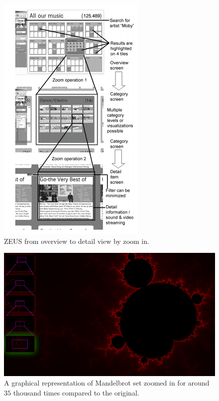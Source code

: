 \begin{figure}[H]
\centering
\includegraphics{Figures/Chapter1/zeus.png}
\decoRule
\caption[Multiple Levels of Overview Plus Details]{ZEUS from overview to detail view by zoom in\cite{gundelsweiler2007zeus}.}
\label{fig:zeus}
\end{figure}

\begin{figure}[H]
\centering
\includegraphics[width=\textwidth,keepaspectratio]{Figures/Chapter1/multiplelevels.png}
\decoRule
\caption[Zoomed-in Fractal Image]{A graphical representation of Mandelbrot set zoomed in for around $35$ thousand times compared to the original.}
\label{fig:multiplelevels}
\end{figure}

